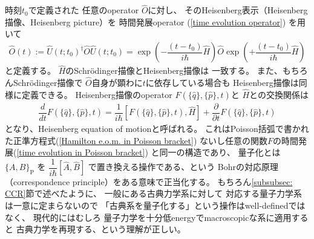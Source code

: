 時刻$t_0$で定義された
任意のoperator $\hat{O}$に対し、
そのHeisenberg表示（Heisenberg描像、Heisenberg picture）を
時間発展operator
(\ref{time evolution operator})
を用いて
\begin{align}
    \hat{O}(t)
    :=
    \hat{U} (t; t_0)^\dagger
        \hat{O}
    \hat{U} (t; t_0)
    =
    \exp\left(
        -\dfrac{ (t - t_0) }{i\hbar}
        \hat{H}
    \right)
        \hat{O}
    \exp\left(
        +\dfrac{ (t - t_0) }{i\hbar}
        \hat{H}
    \right)
\end{align}
と定義する。
$\hat{H}$のSchr\"odinger描像とHeisenberg描像は
一致する。
また、もちろんSchr\"odinger描像で
$\hat{O}$自身が顕わに$t$に依存している場合も
Heisenberg描像は同様に定義できる。
Heisenberg描像のoperator
$F(\{ \hat{q} \},\{ \hat{p} \}, t)$と
$\hat{H}$との交換関係は
\begin{align}
    \dfrac{d}{d t}
    F(\{ \hat{q} \},\{ \hat{p} \}, t)
    =
    \dfrac{1}{i\hbar}
    [F(\{ \hat{q} \},\{ \hat{p} \}, t), \hat{H}]
    + \dfrac{\partial}{\partial t}
    F(\{ \hat{q} \},\{ \hat{p} \}, t)
    \label{Heisenberg e.o.m}
\end{align}
となり、Heisenberg equation of motionと呼ばれる。
これはPoisson括弧で書かれた正準方程式(\ref{Hamilton e.o.m. in Poisson bracket})
ないし任意の関数$F$の時間発展(\ref{time evolution in Poisson bracket})
と同一の構造であり、
量子化とは
$\{A, B\}_{ \mathrm{P} }$
を
$\dfrac{1}{i\hbar} [\hat{A}, \hat{B}]$
で置き換える操作である、という
Bohrの対応原理（correspondence principle）をある意味で正当化する。
もちろん\ref{subsubsec: CCR}節で述べたように、
一般にある古典力学系に対して
対応する量子力学系は一意に定まらないので
「古典系を量子化する」という操作はwell-definedではなく、
現代的にはむしろ
量子力学を十分低energyでmacroscopicな系に適用すると
古典力学を再現する、という理解が正しい。
